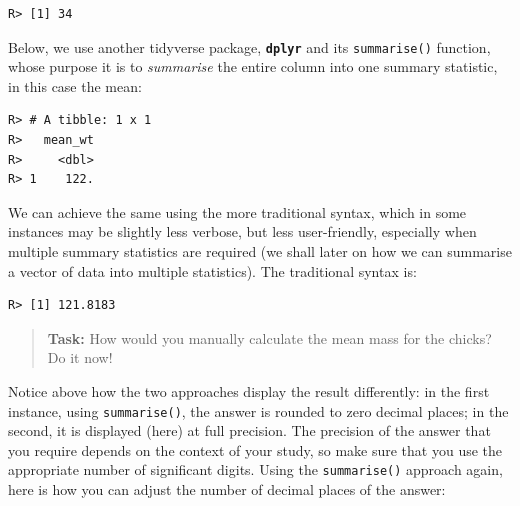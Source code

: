 \documentclass[english,10pt,a4paper,oneside]{book}
\newenvironment{Shaded}{\begin{snugshade}}{\end{snugshade}}
\newcommand{\KeywordTok}[1]{\textcolor[rgb]{0.13,0.29,0.53}{\textbf{#1}}}
\newcommand{\DataTypeTok}[1]{\textcolor[rgb]{0.13,0.29,0.53}{#1}}
\newcommand{\StringTok}[1]{\textcolor[rgb]{0.31,0.60,0.02}{#1}}
\newcommand{\CommentTok}[1]{\textcolor[rgb]{0.56,0.35,0.01}{\textit{#1}}}
\newcommand{\OperatorTok}[1]{\textcolor[rgb]{0.81,0.36,0.00}{\textbf{#1}}}
\newcommand{\NormalTok}[1]{#1}
\theoremstyle{definition}
\theoremstyle{definition}
\theoremstyle{definition}
\theoremstyle{remark}
\begin{document}
\begin{verbatim}
R> [1] 34
\end{verbatim}

Below, we use another tidyverse package, \textbf{\texttt{dplyr}} and its
\texttt{summarise()} function, whose purpose it is to \emph{summarise}
the entire column into one summary statistic, in this case the mean:

\begin{Shaded}
\end{Shaded}

\begin{verbatim}
R> # A tibble: 1 x 1
R>   mean_wt
R>     <dbl>
R> 1    122.
\end{verbatim}

We can achieve the same using the more traditional syntax, which in some
instances may be slightly less verbose, but less user-friendly,
especially when multiple summary statistics are required (we shall later
on how we can summarise a vector of data into multiple statistics). The
traditional syntax is:

\begin{Shaded}
\end{Shaded}

\begin{verbatim}
R> [1] 121.8183
\end{verbatim}

\begin{quote}
\textbf{Task:} How would you manually calculate the mean mass for the
chicks? Do it now!
\end{quote}

Notice above how the two approaches display the result differently: in
the first instance, using \texttt{summarise()}, the answer is rounded to
zero decimal places; in the second, it is displayed (here) at full
precision. The precision of the answer that you require depends on the
context of your study, so make sure that you use the appropriate number
of significant digits. Using the \texttt{summarise()} approach again,
here is how you can adjust the number of decimal places of the answer:
\end{document}
